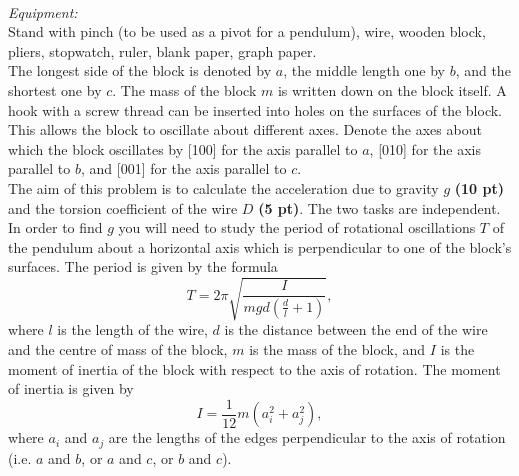 \documentclass[../TST.tex]{subfiles}
\begin{document}
\begin{eproblem}{\ \\[5pt]}
\textit{Equipment:}\\
Stand with pinch (to be used as a pivot for a pendulum), wire, wooden block, pliers, stopwatch, ruler, blank paper, graph paper.\\[5pt]
The longest side of the block is denoted by $a$, the middle length one by $b$, and the shortest one by $c$. The mass of the block $m$ is written down on the block itself. A hook with a screw thread can be inserted into holes on the surfaces of the block. This allows the block to oscillate about different axes. Denote the axes about which the block oscillates by [100] for the axis parallel to $a$, [010] for the axis parallel to $b$, and [001] for the axis parallel to $c$.\\[5pt]
The aim of this problem is to calculate the acceleration due to gravity $g$ \textbf{(10 pt)} and the torsion coefficient of the wire $D$ \textbf{(5 pt)}. The two tasks are independent.\\

In order to find $g$ you will need to study the period of rotational oscillations $T$ of the pendulum about a horizontal axis which is perpendicular to one of the block's surfaces. The period is given by the formula
\begin{equation*}
	T=2\pi\sqrt{\frac{I}{mgd \left(\frac{d}{l}+1 \right)}}
,
\end{equation*}
where $l$ is the length of the wire, $d$ is the distance between the end of the wire and the centre of mass of the block, $m$ is the mass of the block, and $I$ is the moment of inertia of the block with respect to the axis of rotation. The moment of inertia is given by 
\begin{equation*}
I=\frac{1}{12}m(a_i^2+a_j^2)
,
\end{equation*}
where $a_i$ and $a_j$ are the lengths of the edges perpendicular to the axis of rotation (i.e. $a$ and $b$, or $a$ and $c$, or $b$ and $c$).


\end{eproblem}
\end{document}
